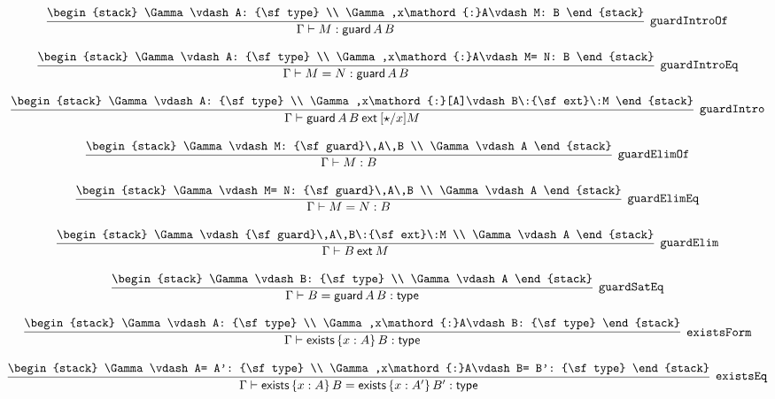 \[
\infer[{\tt guardIntroOf}]{\Gamma \vdash M: {\sf guard}\,A\,B}{
\begin{stack}
\Gamma \vdash A: {\sf type}
\\
\Gamma ,x\mathord{:}A\vdash M: B
\end{stack}}
\]

\[
\infer[{\tt guardIntroEq}]{\Gamma \vdash M= N: {\sf guard}\,A\,B}{
\begin{stack}
\Gamma \vdash A: {\sf type}
\\
\Gamma ,x\mathord{:}A\vdash M= N: B
\end{stack}}
\]

\[
\infer[{\tt guardIntro}]{\Gamma \vdash {\sf guard}\,A\,B\:{\sf ext}\:[\star /x]M}{
\begin{stack}
\Gamma \vdash A: {\sf type}
\\
\Gamma ,x\mathord{:}[A]\vdash B\:{\sf ext}\:M
\end{stack}}
\]

\[
\infer[{\tt guardElimOf}]{\Gamma \vdash M: B}{
\begin{stack}
\Gamma \vdash M: {\sf guard}\,A\,B
\\
\Gamma \vdash A
\end{stack}}
\]

\[
\infer[{\tt guardElimEq}]{\Gamma \vdash M= N: B}{
\begin{stack}
\Gamma \vdash M= N: {\sf guard}\,A\,B
\\
\Gamma \vdash A
\end{stack}}
\]

\[
\infer[{\tt guardElim}]{\Gamma \vdash B\:{\sf ext}\:M}{
\begin{stack}
\Gamma \vdash {\sf guard}\,A\,B\:{\sf ext}\:M
\\
\Gamma \vdash A
\end{stack}}
\]

\[
\infer[{\tt guardSatEq}]{\Gamma \vdash B= {\sf guard}\,A\,B: {\sf type}}{
\begin{stack}
\Gamma \vdash B: {\sf type}
\\
\Gamma \vdash A
\end{stack}}
\]

\[
\infer[{\tt existsForm}]{\Gamma \vdash {\sf exists}\,\{x : A\}\,B: {\sf type}}{
\begin{stack}
\Gamma \vdash A: {\sf type}
\\
\Gamma ,x\mathord{:}A\vdash B: {\sf type}
\end{stack}}
\]

\[
\infer[{\tt existsEq}]{\Gamma \vdash {\sf exists}\,\{x : A\}\,B= {\sf exists}\,\{x : A'\}\,B': {\sf type}}{
\begin{stack}
\Gamma \vdash A= A': {\sf type}
\\
\Gamma ,x\mathord{:}A\vdash B= B': {\sf type}
\end{stack}}
\]

